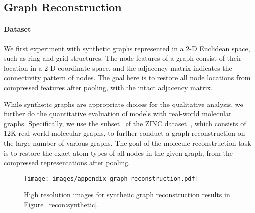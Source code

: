 \subsection{Graph Reconstruction \label{appendix/reconstruction/experimentaldetail}}

\paragraph{Dataset}
We first experiment with synthetic graphs represented in a 2-D Euclidean space, such as ring and grid structures. The node features of a graph consist of their location in a 2-D coordinate space, and the adjacency matrix indicates the connectivity pattern of nodes. The goal here is to restore all node locations from compressed features after pooling, with the intact adjacency matrix.

While synthetic graphs are appropriate choices for the qualitative analysis, we further do the quantitative evaluation of models with real-world molecular graphs. Specifically, we use the subset~\citep{benchmarkingGNN} of the ZINC dataset~\citep{ZINC}, which consists of 12K real-world molecular graphs, to further conduct a graph reconstruction on the large number of various graphs. The goal of the molecule reconstruction task is to restore the exact atom types of all nodes in the given graph, from the compressed representations after pooling.

\begin{figure*}[t]
    \centering
    \texttt{[image: images/appendix\_graph\_reconstruction.pdf]}
    \vskip -0.2in
    \caption{High resolution images for synthetic graph reconstruction results in Figure~\ref{recon:synthetic}.}
    \label{fig:appendix/synthetic}
    \vskip -0.15in
\end{figure*}

